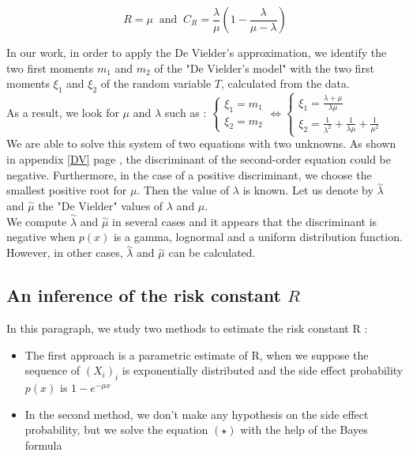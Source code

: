 \documentclass[12pt,twoside]{article}
\begin{document}
\begin{equation}
R=\mu ~ \textrm{ and } ~ C_R=\frac{\lambda}{\mu}(1-\frac{\lambda}{\mu-\lambda})
\label{eq_DV}
\end{equation}

In our work, in order to apply the De Vielder's approximation, we identify the two first moments $m_1$ 
and $m_2$ of the "De Vielder's model" with the two first moments $\xi_1$ and $\xi_2$ of the
random variable $T$, calculated from the data.\\ 

As a result, we look for $\mu$ and $\lambda$ such as :
$\left\{ 
\begin{array}{c}
\xi_1=m_1\\
\xi_2=m_2
\end{array}
\right.
\Leftrightarrow 
\left\{
\begin{array}{c}
\xi_1=\frac{\lambda+\mu}{\lambda \mu}\\
\xi_2=\frac{1}{\lambda^2}+\frac{1}{\lambda \mu}+ \frac{1}{\mu^2} 
\end{array}
\right.$\\

We are able to solve this system of two equations with two unknowns. As shown in appendix \ref{DV}
page \pageref{DV}, the discriminant of the second-order equation could be negative. 
Furthermore, in the case of a positive discriminant, we choose the smallest positive root for $\mu$.
Then the value of $\lambda$  is known. Let us denote by $\stackrel{\sim}{\lambda}$ and $\stackrel{\sim}{\mu}$
the "De Vielder" values of $\lambda$ and $\mu$.\\

We compute $\stackrel{\sim}{\lambda}$ and $\stackrel{\sim}{\mu}$ in several cases and it appears
that the discriminant is negative when $p(x)$ is a gamma, lognormal and a uniform distribution function. 
However, in other cases, $\stackrel{\sim}{\lambda}$ and $\stackrel{\sim}{\mu}$ can be calculated.



\subsection{An inference of the risk constant $R$}
In this paragraph, we study two methods to estimate the risk constant R : 
\begin{itemize}
\item{The first approach is a parametric estimate of R, when we suppose the sequence of $(X_i)_i$ is exponentially distributed and the side effect probability $p(x)$ is $1-e^{-\mu x}$  }
\item{In the second method, we don't make any hypothesis on the side effect probability, but we solve the equation $(\star)$ with the help of the Bayes formula} 
\end{itemize}
\end{document}
